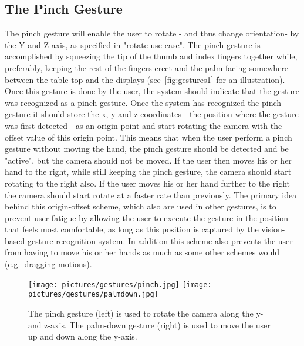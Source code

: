 \subsection{The Pinch Gesture}
The pinch gesture will enable the user to rotate - and thus change orientation- by the Y and Z axis, as specified in "rotate-use case". 
The pinch gesture is accomplished by squeezing the tip of the thumb and index fingers together while, preferably, keeping the rest of the fingers erect and the palm facing 
somewhere between the table top and the displays (see~\vref{fig:gestures1} for an illustration). Once this gesture is done by the user, 
the system should indicate that the gesture was recognized as a pinch gesture.
Once the system has recognized the pinch gesture it should store the x, y and z coordinates - the position where the gesture was first detected - as an origin point and start rotating the 
camera with the offset value of this origin point. This means that when the user perform a pinch gesture without moving the hand, the pinch gesture should be detected and be
"active", but the camera should not be moved. If the user then moves his or her hand to the right, while still keeping the pinch gesture, the camera should start rotating 
to the right also. If the user moves his or her hand further to the right the camera should start rotate at a faster rate than previously.  
The primary idea behind this origin-offset scheme, which also are used in other gestures, is to prevent user fatigue by allowing the user to execute
the gesture in the position that feels most comfortable, as long as this position is captured by the vision-based gesture recognition system. 
In addition this scheme also prevents the user from having to move his or her hands as much as some other schemes would (e.g.~dragging motions).  

\begin{figure}%
	\texttt{[image: pictures/gestures/pinch.jpg]}
    \texttt{[image: pictures/gestures/palmdown.jpg]}
	\caption[The pinch and palm-down gestures]{The pinch gesture (left) is used to rotate the camera along the y- and z-axis. 
             The palm-down gesture (right) is used to move the user up and down along the y-axis.}
	\label{fig:gestures1}
\end{figure} 

